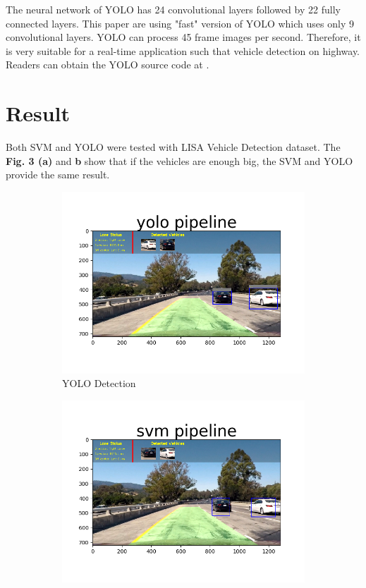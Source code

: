 \documentclass[conference]{IEEEtran}
\begin{document}
The neural network of YOLO has 24 convolutional layers followed by 22 fully connected layers. This paper are using "fast" version of YOLO which uses only 9 convolutional layers. YOLO can process 45 frame images per second. Therefore, it is very suitable for a real-time application such that vehicle detection on highway. Readers can obtain the YOLO source code at \cite{YOLO Source}.

\section{Result}
Both SVM and YOLO were tested with LISA Vehicle Detection dataset.
The \textbf{Fig. 3 (a)} and \textbf{b} show  that if the vehicles are enough big, the SVM and YOLO provide the same result.

\begin{figure}[h]
\centering
	\begin{subfigure}[t]{0.2\textwidth} 
		\centering
		\includegraphics[scale=0.2]{figures/yolo_test_01.png}
		\caption{YOLO Detection}
	\end{subfigure}
	\begin{subfigure}[t]{0.2\textwidth} 
		\centering
		\includegraphics[scale=0.2]{figures/svm_test_01.png}

\end{subfigure}
\end{figure}
\end{document}
